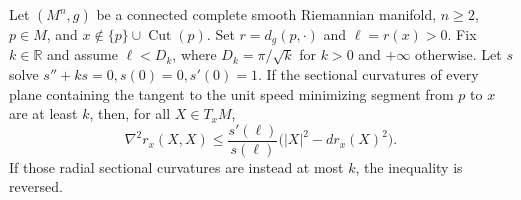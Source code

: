 Let \((M^n,g)\) be a connected complete smooth Riemannian manifold, \(n\ge2\), \(p\in M\), and \(x\notin\{p\}\cup\operatorname{Cut}(p)\). Set \(r=d_g(p,\cdot)\) and \(\ell=r(x)>0\). Fix \(k\in\mathbb R\) and assume \(\ell<D_k\), where \(D_k=\pi/\sqrt{k}\) for \(k>0\) and \(+\infty\) otherwise. Let \(s\) solve \(s''+ks=0,s(0)=0,s'(0)=1\).
If the sectional curvatures of every plane containing the tangent to the unit speed minimizing segment from \(p\) to \(x\) are at least \(k\), then, for all \(X\in T_xM\),
\[
\nabla^2r_x(X,X)\le \frac{s'(\ell)}{s(\ell)}\bigl(|X|^2-dr_x(X)^2\bigr).
\]
If those radial sectional curvatures are instead at most \(k\), the inequality is reversed.